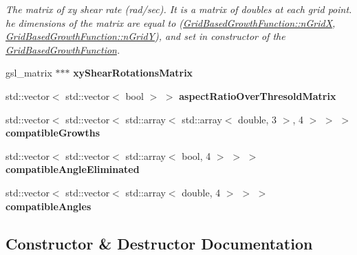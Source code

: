 \begin{DoxyCompactItemize}
\begin{DoxyCompactList}\small\item\em The matrix of xy shear rate (rad/sec). It is a matrix of doubles at each grid point. he dimensions of the matrix are equal to (\hyperlink{classGridBasedGrowthFunction_a6d36f433ad29dd4f36352900d3795469}{Grid\+Based\+Growth\+Function\+::n\+Grid\+X}, \hyperlink{classGridBasedGrowthFunction_ac992521b24e1975df1c7372c11285217}{Grid\+Based\+Growth\+Function\+::n\+Grid\+Y}), and set in constructor of the \hyperlink{classGridBasedGrowthFunction}{Grid\+Based\+Growth\+Function}. \end{DoxyCompactList}\item 
\hypertarget{classGridBasedGrowthFunction_a62e3267b367261ff2f37cee9a7c2b02b}{}gsl\+\_\+matrix $\ast$$\ast$$\ast$ {\bfseries xy\+Shear\+Rotations\+Matrix}\label{classGridBasedGrowthFunction_a62e3267b367261ff2f37cee9a7c2b02b}

\item 
\hypertarget{classGridBasedGrowthFunction_ad742ebf1ac5dd089bb5c32660f0f9fae}{}std\+::vector$<$ std\+::vector$<$ bool $>$ $>$ {\bfseries aspect\+Ratio\+Over\+Thresold\+Matrix}\label{classGridBasedGrowthFunction_ad742ebf1ac5dd089bb5c32660f0f9fae}

\item 
\hypertarget{classGridBasedGrowthFunction_a98397200ea57daee809399b70de72a46}{}std\+::vector$<$ std\+::vector$<$ std\+::array$<$ std\+::array$<$ double, 3 $>$, 4 $>$ $>$ $>$ {\bfseries compatible\+Growths}\label{classGridBasedGrowthFunction_a98397200ea57daee809399b70de72a46}

\item 
\hypertarget{classGridBasedGrowthFunction_a97ce742bcd8818ad425924a5eb0292ba}{}std\+::vector$<$ std\+::vector$<$ std\+::array$<$ bool, 4 $>$ $>$ $>$ {\bfseries compatible\+Angle\+Eliminated}\label{classGridBasedGrowthFunction_a97ce742bcd8818ad425924a5eb0292ba}

\item 
\hypertarget{classGridBasedGrowthFunction_ad746f44bcf84433ba43e0fb607fe4117}{}std\+::vector$<$ std\+::vector$<$ std\+::array$<$ double, 4 $>$ $>$ $>$ {\bfseries compatible\+Angles}\label{classGridBasedGrowthFunction_ad746f44bcf84433ba43e0fb607fe4117}

\end{DoxyCompactItemize}


\subsection{Constructor \& Destructor Documentation}
\hypertarget{classGridBasedGrowthFunction_a41bd402824d5c21605d65db0024cb38a}{}
